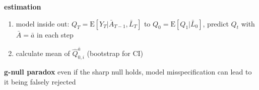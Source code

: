 \documentclass[8pt]{extarticle}
\begin{document}
\begin{multicols}{2}
\noindent \colorbox{lightgray!20!white}{
\begin{minipage}{28em}


\begin{mdframed}[linecolor=black!20!,
    outerlinewidth=0.2pt,
    innertopmargin=0.5\baselineskip,
    innerbottommargin=0.5\baselineskip,
    backgroundcolor=lightgray!20!white, innerleftmargin=2pt, innerrightmargin=2pt]
\textbf{estimation} \citep{schomaker_using_2019}

\begin{enumerate}[itemsep=0em, topsep=0pt, partopsep=0pt,parsep=0pt, leftmargin=1.5em]
\setlength{\itemsep}{0pt}%
\setlength{\parskip}{0pt}
\item model inside out: $Q_{T} {=} \mathrm{E} \left[Y_T| \bar{A}_{T{-}1}, \bar{L}_T \right]$ to $Q_0 {=} \mathrm{E} \left[Q_1| \bar{L}_0 \right]$, predict $Q_t$ with $\bar{A} = \bar{a}$ in each step
\item calculate mean of $\hat{Q}_{0,i}^{\bar{a}}$ (bootstrap for CI)
\end{enumerate}



\end{mdframed}

\noindent \textbf{g-null paradox} even if the sharp null holds, model misspecification can lead to it being falsely rejected

\end{minipage}}




\end{multicols}
\end{document}
